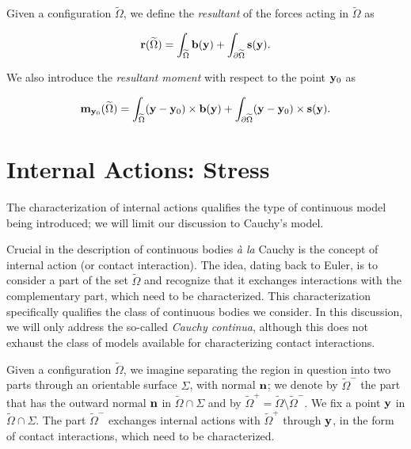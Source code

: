 Given a configuration $\widetilde{\Omega}$, we define the \textit{resultant} of the forces acting in $\widetilde{\Omega}$ as
\begin{definition}
	\begin{equation}
		\mathbf{r}(\widetilde{\Omega}) = \int_{\widetilde{\Omega}} \mathbf{b}(\mathbf{y}) + \int_{\partial\widetilde{\Omega}} \mathbf{s}(\mathbf{y}).
	\end{equation}
\end{definition}
We also introduce the \textit{resultant moment} with respect to the point $\mathbf{y}_0$ as
\begin{definition}
	\begin{equation}
		\mathbf{m}_{\mathbf{y}_0}(\widetilde{\Omega}) = \int_{\widetilde{\Omega}} (\mathbf{y} - \mathbf{y}_0) \times \mathbf{b}(\mathbf{y}) + \int_{\partial\widetilde{\Omega}} (\mathbf{y} - \mathbf{y}_0) \times \mathbf{s}(\mathbf{y}).
	\end{equation}
\end{definition}


\section{Internal Actions: Stress}

The characterization of internal actions qualifies the type of continuous model being introduced; we will limit our discussion to Cauchy's model.

Crucial in the description of continuous bodies \textit{à la} Cauchy is the concept of internal action (or contact interaction). The idea, dating back to Euler, is to consider a part of the set $\widetilde{\Omega}$ and recognize that it exchanges interactions with the complementary part, which need to be characterized. This characterization specifically qualifies the class of continuous bodies we consider. In this discussion, we will only address the so-called \textit{Cauchy continua}, although this does not exhaust the class of models available for characterizing contact interactions.

Given a configuration $\widetilde{\Omega}$, we imagine separating the region in question into two parts through an orientable surface $\Sigma$, with normal $\mathbf{n}$; we denote by $\widetilde{\Omega}^-$ the part that has the outward normal $\mathbf{n}$ in $\widetilde{\Omega} \cap \Sigma$ and by $\widetilde{\Omega}^+=\widetilde{\Omega}\setminus\widetilde{\Omega}^-$. We fix a point $\mathbf{y}$ in $\widetilde{\Omega} \cap \Sigma$. The part $\widetilde{\Omega}^-$ exchanges internal actions with $\widetilde{\Omega}^+$ through $\mathbf{y}$, in the form of contact interactions, which need to be characterized.

